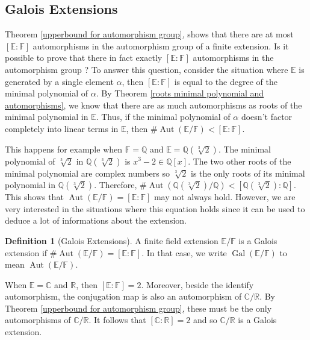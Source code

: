 \documentclass{article}
\theoremstyle{plain}
\theoremstyle{definition}
\newtheorem*{definition}{Definition}
\newcommand{\C}{\mathbb{C}}
\newcommand{\R}{\mathbb{R}}
\newcommand{\Q}{\mathbb{Q}}
\newcommand{\F}{\mathbb{F}}
\newcommand{\E}{\mathbb{E}}
\DeclareMathOperator{\Aut}{Aut}
\DeclareMathOperator{\Gal}{Gal}
\begin{document}
\subsection{Galois Extensions} \label{galois_extensions}

Theorem \ref{upperbound for automorphism group}, shows that there are at most $[\E : \F]$ automorphisms in the automorphism group of a finite extension. Is it possible to prove that there in fact exactly  $[\E : \F]$ automorphisms in the automorphism group ? To answer this question, consider the situation where $\E$ is generated by a single element $\alpha$, then $[\E : \F]$ is equal to the degree of the minimal polynomial of $\alpha$. By Theorem \ref{roots minimal polynomial and automorphisms}, we know that there are as much automorphisms as roots of the minimal polynomial in $\E$. Thus, if the minimal polynomial of $\alpha$ doesn't factor completely into linear terms in $\E$, then $\#\Aut(\E / \F) < [\E : \F]$.

This happens for example when $\F = \Q$ and $\E = \Q(\sqrt[3]{2})$. The minimal polynomial of $\sqrt[3]{2}$ in $\Q(\sqrt[3]{2})$ is $x^3 - 2 \in \Q[x]$. The two other roots of the minimal polynomial are complex numbers so $\sqrt[3]{2}$ is the only roots of its minimal polynomial in $\Q(\sqrt[3]{2})$. Therefore, $\#\Aut(\Q(\sqrt[3]{2}) / \Q) < [\Q(\sqrt[3]{2}) : \Q]$. This shows that $\Aut(\E / \F) = [\E : \F]$ may not always hold. However, we are very interested in the situations where this equation holds since it can be used to deduce a lot of informations about the extension.

\begin{definition}[Galois Extensions]
    A finite field extension $\E / \F$ is a Galois extension if $\# \Aut(\E / \F) = [\E : \F]$. In that case, we write $\Gal(\E / \F)$ to mean $\Aut(\E / \F)$.
\end{definition}

When $\E = \C$ and $\R$, then $[\E : \F] = 2$. Moreover, beside the identify automorphism, the conjugation map is also an automorphism of $\C / \R$. By Theorem \ref{upperbound for automorphism group}, these must be the only automorphisms of $\C / \R$. It follows that $[\C : \R] = 2$ and so $\C / \R$ is a Galois extension.
\end{document}
